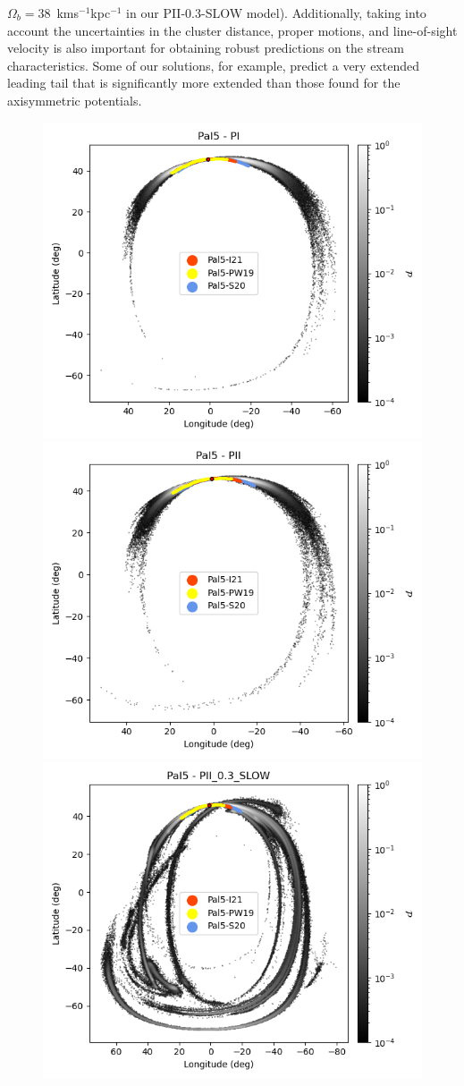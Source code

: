 $\Omega_b=38$~kms$^{-1}$kpc$^{-1}$ in our PII-0.3-SLOW model). Additionally, taking into account the uncertainties in the cluster distance, proper motions, and line-of-sight velocity is also important for obtaining robust predictions on the stream characteristics. Some of our solutions, for example, predict a very extended leading tail that is significantly more extended than those found for the axisymmetric potentials.

            \twocolumn
            \begin{figure}[h!]
                \begin{center}
                    \includegraphics[clip=true, trim = 0mm 0mm 0mm 0mm, width=0.65\columnwidth]{images/PI_individual_Pal5_galstream-Pal5-l-b.png}
                    \includegraphics[clip=true, trim = 0mm 0mm 0mm 0mm, width=0.65\columnwidth]{images/PII_individual_Pal5_galstream-Pal5-l-b.png}
                    \includegraphics[clip=true, trim = 0mm 0mm 0mm 0mm, width=0.65\columnwidth]{images/PII_0.3_SLOW_individual_Pal5_galstream-Pal5-l-b.png}


\end{center}
\end{figure}
